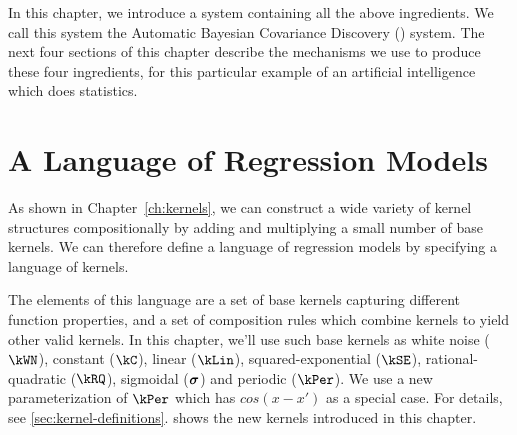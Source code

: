 In this chapter, we introduce a system containing all the above ingredients.
We call this system the Automatic Bayesian Covariance Discovery (\procedurename{}) system.
The next four sections of this chapter describe the mechanisms we use to produce these four ingredients, for this particular example of an artificial intelligence which does statistics.



\section{A Language of Regression Models}
\label{sec:improvements}

As shown in Chapter~\ref{ch:kernels}, we can construct a wide variety of kernel structures compositionally by adding and multiplying a small number of base kernels.
We can therefore define a language of regression models by specifying a language of kernels.

The elements of this language are a set of base kernels capturing different function properties, and a set of
composition rules which combine kernels to yield other valid kernels.
In this chapter, we'll use such base kernels as white noise ($\kWN$), constant ($\kC$), linear ($\kLin$), squared-exponential ($\kSE$), rational-quadratic ($\kRQ$), sigmoidal ($\boldsymbol\sigma$) and periodic ($\kPer$).
We use a new parameterization of $\kPer$ which has $cos(x - x')$ as a special case.
For details, see \cref{sec:kernel-definitions}.
 shows the new kernels introduced in this chapter.

